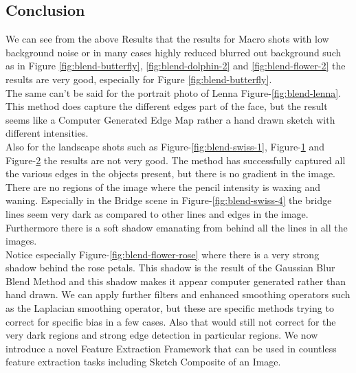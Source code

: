 \documentclass{article}
\begin{document}
\begin{figure}[ht]
    \centering
    \qquad
    \caption{\label{fig:blend-swiss-2}}
\end{figure}

\begin{figure}[ht]
    \centering
    \qquad
    \caption{\label{fig:blend-swiss-3}}
\end{figure}

\clearpage
\subsection{Conclusion}
We can see from the above Results that the results for Macro shots with low background noise or in many 
cases highly reduced blurred out background such as in Figure \ref{fig:blend-butterfly}, 
\ref{fig:blend-dolphin-2} and \ref{fig:blend-flower-2} the results are very good, especially for 
Figure \ref{fig:blend-butterfly}. \\

The same can't be said for the portrait photo of Lenna Figure-\ref{fig:blend-lenna}. This method does capture the
different edges part of the face, but the result seems like a Computer Generated Edge Map rather
a hand drawn sketch with different intensities. \\ 

Also for the landscape shots such as Figure-\ref{fig:blend-swiss-1}, Figure-\ref{fig:blend-swiss-2} and
Figure-\ref{fig:blend-swiss-3} the results are not very good. The method has successfully captured all
the various edges in the objects present, but there is no gradient in the image. There are no regions 
of the image where the pencil intensity is waxing and waning. Especially in the Bridge scene in 
Figure-\ref{fig:blend-swiss-4} the bridge lines seem very dark as compared to other lines and edges in
the image. Furthermore there is a soft shadow emanating from behind all the lines in all the images. \\

Notice especially Figure-\ref{fig:blend-flower-rose} where there is a very strong shadow behind the rose petals. This shadow is the result of the Gaussian Blur Blend Method and this shadow makes it appear 
computer generated rather than hand drawn. We can apply further filters and enhanced smoothing operators
such as the Laplacian smoothing operator, but these are specific methods trying to correct for specific bias in a few cases. Also that would still not correct for the very dark regions and strong edge detection
in particular regions. We now introduce a novel Feature Extraction Framework that can be used in countless
feature extraction tasks including Sketch Composite of an Image.
\end{document}
